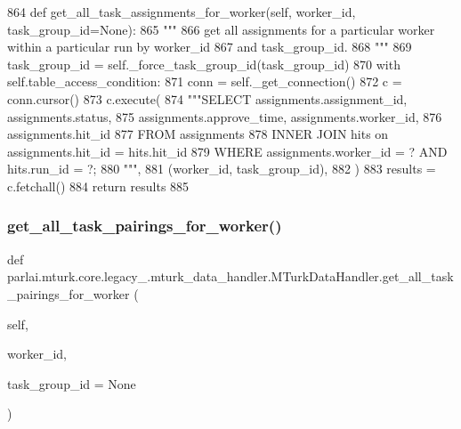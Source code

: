\begin{DoxyCode}
864     \textcolor{keyword}{def }get\_all\_task\_assignments\_for\_worker(self, worker\_id, task\_group\_id=None):
865         \textcolor{stringliteral}{"""}
866 \textcolor{stringliteral}{        get all assignments for a particular worker within a particular run by worker\_id}
867 \textcolor{stringliteral}{        and task\_group\_id.}
868 \textcolor{stringliteral}{        """}
869         task\_group\_id = self.\_force\_task\_group\_id(task\_group\_id)
870         with self.table\_access\_condition:
871             conn = self.\_get\_connection()
872             c = conn.cursor()
873             c.execute(
874                 \textcolor{stringliteral}{"""SELECT assignments.assignment\_id, assignments.status,}
875 \textcolor{stringliteral}{                         assignments.approve\_time, assignments.worker\_id,}
876 \textcolor{stringliteral}{                         assignments.hit\_id}
877 \textcolor{stringliteral}{                         FROM assignments}
878 \textcolor{stringliteral}{                         INNER JOIN hits on assignments.hit\_id = hits.hit\_id}
879 \textcolor{stringliteral}{                         WHERE assignments.worker\_id = ? AND hits.run\_id = ?;}
880 \textcolor{stringliteral}{                         """},
881                 (worker\_id, task\_group\_id),
882             )
883             results = c.fetchall()
884             \textcolor{keywordflow}{return} results
885 
\end{DoxyCode}
\mbox{\label{classparlai_1_1mturk_1_1core_1_1legacy__2018_1_1mturk__data__handler_1_1MTurkDataHandler_ae5c1f4e4db038e23d1bd2abd6d6c35cd}} 
\subsubsection{\texorpdfstring{get\+\_\+all\+\_\+task\+\_\+pairings\+\_\+for\+\_\+worker()}{get\_all\_task\_pairings\_for\_worker()}}
{\footnotesize\ttfamily def parlai.\+mturk.\+core.\+legacy\+\_.\+mturk\+\_\+data\+\_\+handler.\+M\+Turk\+Data\+Handler.\+get\+\_\+all\+\_\+task\+\_\+pairings\+\_\+for\+\_\+worker (\begin{DoxyParamCaption}\item[{}]{self,  }\item[{}]{worker\+\_\+id,  }\item[{}]{task\+\_\+group\+\_\+id = {\ttfamily None} }\end{DoxyParamCaption})}

